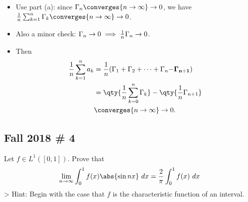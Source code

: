 \begin{solution}
\begin{itemize}
\item
  Use part (a): since \(\Gamma_n \converges{n\to\infty}\to 0\), we have
  \({1\over n} \sum_{k=1}^n \Gamma_k \converges{n\to\infty}\to 0\).
\item
  Also a minor check:
  \(\Gamma_n \to 0 \implies {1\over n}\Gamma_n \to 0\).
\item
  Then
  \begin{align*}
  \frac 1 n \sum_{k=1}^n a_k 
  &= \frac 1 n (\Gamma_1 + \Gamma_2 + \cdots + \Gamma_{n} \mathbf{- \Gamma_{n+1}}) \\
  &= \qty{ {1\over n } \sum_{k=0}^n \Gamma_k } - \qty{{1\over n}\Gamma_{n+1} } \\
  &\converges{n\to\infty}\to 0
  .\end{align*}
\end{itemize}

\end{solution}

\hypertarget{fall-2018-4}{%
\subsection{Fall 2018 \# 4}\label{fall-2018-4}}

Let \(f\in L^1([0, 1])\). Prove that
\begin{align*}
\lim_{n \to \infty} \int_{0}^{1} f(x) \abs{\sin n x} ~d x= \frac{2}{\pi} \int_{0}^{1} f(x) ~d x
\end{align*} \textgreater{} Hint: Begin with the case that \(f\) is the
characteristic function of an interval.

